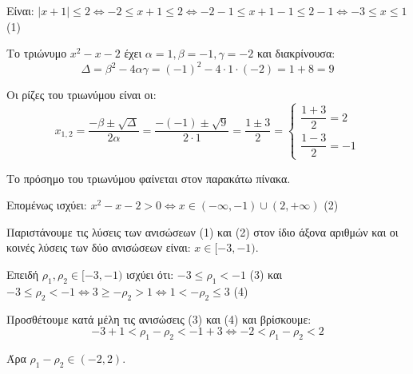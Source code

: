 
\begin{alist}
\item Είναι:
$|x + 1| \le 2 \Leftrightarrow -2 \le x + 1 \le 2 \Leftrightarrow -2 - 1 \le x + 1 - 1 \le 2 - 1 \Leftrightarrow -3 \le x \le 1$ (1)

Το τριώνυμο $x^2 - x - 2$ έχει $\alpha = 1, \beta = -1, \gamma = -2$ και διακρίνουσα:
\[\Delta = \beta^2 - 4\alpha\gamma = (-1)^2 - 4 \cdot 1 \cdot (-2) = 1 + 8 = 9\]

Οι ρίζες του τριωνύμου είναι οι:
\[x_{1,2} = \dfrac{-\beta \pm \sqrt{\Delta}}{2\alpha} = \dfrac{-(-1) \pm \sqrt{9}}{2 \cdot 1} = \dfrac{1 \pm 3}{2} = \begin{cases} \dfrac{1 + 3}{2} = 2 \\ \dfrac{1 - 3}{2} = -1 \end{cases}\]

Το πρόσημο του τριωνύμου φαίνεται στον παρακάτω πίνακα.

\begin{center}
\end{center}

Επομένως ισχύει: $x^2 - x - 2 > 0 \Leftrightarrow x \in (-\infty, -1) \cup (2, +\infty)$ (2)

\item Παριστάνουμε τις λύσεις των ανισώσεων (1) και (2) στον ίδιο άξονα αριθμών και οι κοινές λύσεις των δύο ανισώσεων είναι: $x \in [-3, -1)$.

\item Επειδή $\rho_1, \rho_2 \in [-3, -1)$ ισχύει ότι:
$-3 \le \rho_1 < -1$ (3)
και
$-3 \le \rho_2 < -1 \Leftrightarrow 3 \ge -\rho_2 > 1 \Leftrightarrow 1 < -\rho_2 \le 3$ (4)

Προσθέτουμε κατά μέλη τις ανισώσεις (3) και (4) και βρίσκουμε:
\[-3 + 1 < \rho_1 - \rho_2 < -1 + 3 \Leftrightarrow -2 < \rho_1 - \rho_2 < 2\]

Άρα $\rho_1 - \rho_2 \in (-2, 2)$.
\end{alist}

